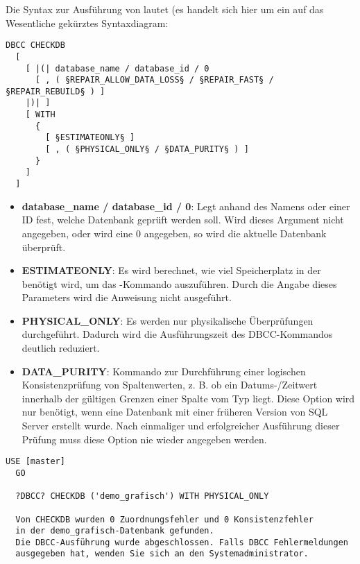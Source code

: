           Die Syntax zur Ausführung von  lautet
          (es handelt sich hier um ein auf das Wesentliche gekürztes
          Syntaxdiagram:
          \begin{lstlisting}[language=ebnf, caption={Die Syntax zu CHECKDB},
          label=admin03_28]
DBCC CHECKDB
  [
    [ |(| database_name / database_id / 0 
      [ , ( §REPAIR_ALLOW_DATA_LOSS§ / §REPAIR_FAST§ / §REPAIR_REBUILD§ ) ]
    |)| ]
    [ WITH
      {
        [ §ESTIMATEONLY§ ]
        [ , ( §PHYSICAL_ONLY§ / §DATA_PURITY§ ) ]
      }
    ]
  ]        
          \end{lstlisting}
          \begin{itemize}
            \item \textbf{database\_name / database\_id / 0}: Legt anhand des
            Namens oder einer ID fest, welche Datenbank geprüft werden soll.
            Wird dieses Argument nicht angegeben, oder wird eine 0 angegeben, so
            wird die aktuelle Datenbank überprüft.
            \item \textbf{ESTIMATEONLY}: Es wird berechnet, wie viel
            Speicherplatz in der  benötigt wird, um das
            -Kommando auszuführen. Durch die Angabe
            dieses Parameters wird die Anweisung nicht ausgeführt.
            \item \textbf{PHYSICAL\_ONLY}: Es werden nur physikalische
            Überprüfungen durchgeführt. Dadurch wird die Ausführungszeit des
            DBCC-Kommandos deutlich reduziert.
            \item \textbf{DATA\_PURITY}: Kommando zur Durchführung einer
            logischen Konsistenzprüfung von Spaltenwerten, z. B. ob ein
            Datums-/Zeitwert innerhalb der gültigen Grenzen einer Spalte vom Typ
             liegt. Diese Option wird nur benötigt, wenn
            eine Datenbank mit einer früheren Version von SQL Server erstellt
            wurde. Nach einmaliger und erfolgreicher Ausführung dieser Prüfung
            muss diese Option nie wieder angegeben werden.
          \end{itemize}
          \begin{lstlisting}[language=ms_sql,caption={Physikalische
          Konsistenzprüfung einer Datenbank mit DBCC},label=admin03_29]
  USE [master]
  GO
  
  ?DBCC? CHECKDB ('demo_grafisch') WITH PHYSICAL_ONLY
  
  Von CHECKDB wurden 0 Zuordnungsfehler und 0 Konsistenzfehler 
  in der demo_grafisch-Datenbank gefunden.
  Die DBCC-Ausführung wurde abgeschlossen. Falls DBCC Fehlermeldungen
  ausgegeben hat, wenden Sie sich an den Systemadministrator.
          \end{lstlisting}         
